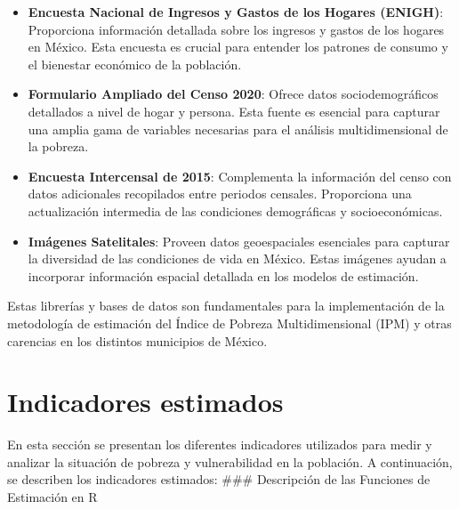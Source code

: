 \documentclass[
  12pt,
]{book}
\providecommand{\tightlist}{%
  \setlength{\itemsep}{0pt}\setlength{\parskip}{0pt}}
\begin{document}
\begin{itemize}
\tightlist
\item
  \textbf{Encuesta Nacional de Ingresos y Gastos de los Hogares (ENIGH)}: Proporciona información detallada sobre los ingresos y gastos de los hogares en México. Esta encuesta es crucial para entender los patrones de consumo y el bienestar económico de la población.
\item
  \textbf{Formulario Ampliado del Censo 2020}: Ofrece datos sociodemográficos detallados a nivel de hogar y persona. Esta fuente es esencial para capturar una amplia gama de variables necesarias para el análisis multidimensional de la pobreza.
\item
  \textbf{Encuesta Intercensal de 2015}: Complementa la información del censo con datos adicionales recopilados entre periodos censales. Proporciona una actualización intermedia de las condiciones demográficas y socioeconómicas.
\item
  \textbf{Imágenes Satelitales}: Proveen datos geoespaciales esenciales para capturar la diversidad de las condiciones de vida en México. Estas imágenes ayudan a incorporar información espacial detallada en los modelos de estimación.
\end{itemize}

Estas librerías y bases de datos son fundamentales para la implementación de la metodología de estimación del Índice de Pobreza Multidimensional (IPM) y otras carencias en los distintos municipios de México.

\hypertarget{indicadores-estimados}{%
\section*{Indicadores estimados}\label{indicadores-estimados}}

En esta sección se presentan los diferentes indicadores utilizados para medir y analizar la situación de pobreza y vulnerabilidad en la población. A continuación, se describen los indicadores estimados:
\#\#\# Descripción de las Funciones de Estimación en R
\end{document}
